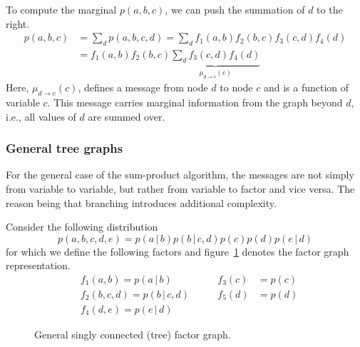 \documentclass{article}
\newcommand{\giv}{\,|\,}
\begin{document}
\noindent To compute the marginal $p(a, b, c)$, we can push the summation of $d$ to the right.
\begin{align*}
    p(a, b, c) &= \sum_d p(a, b, c, d) = \sum_d f_1(a, b)f_2(b, c)f_3(c, d)f_4(d)\\
    &= f_1(a, b)f_2(b, c) \underbrace{\sum_d f_3(c, d)f_4(d)}_{\mu_{d \rightarrow c}(c)}
\end{align*}
\noindent Here, $\mu_{d \rightarrow c}(c)$, defines a message from node $d$ to node $c$ and is a function of variable $c$. This message carries marginal information from the graph beyond $d$, i.e., all values of $d$ are summed over. 

\subsubsection{General tree graphs}
For the general case of the sum-product algorithm, the messages are not simply from variable to variable, but rather from variable to factor and vice versa. The reason being that branching introduces additional complexity. 

Consider the following distribution
$$
    p(a, b, c, d, e) = p(a \giv b) p(b \giv c, d) p(c) p(d) p(e \giv d)
$$
for which we define the following factors and figure~\ref{fig:fg_sum} denotes the factor graph representation.
\begin{align*}
    &f_1(a, b) = p(a \giv b) \qquad&  f_3(c) &= p(c)\\
    &f_2(b, c, d) = p(b \giv c, d) \qquad& f_5(d) &= p(d)\\
    &f_4(d, e) = p(e \giv d) &
\end{align*}

\begin{figure}[ht]
    \centering
    
    \caption{General singly connected (tree) factor graph.}
    \label{fig:fg_sum}
\end{figure}
\end{document}
